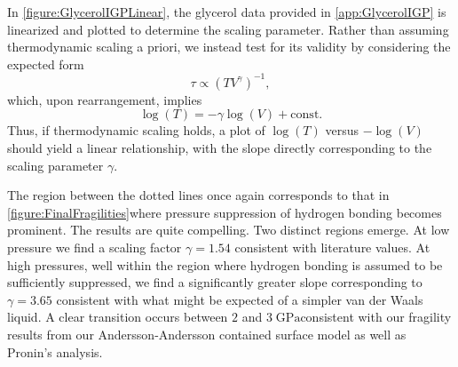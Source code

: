 In \fig \ref{figure:GlycerolIGPLinear}, the glycerol \tgp data provided in \app \ref{app:GlycerolIGP} is linearized and plotted to determine the scaling parameter.  Rather than assuming thermodynamic scaling a priori, we instead test for its validity by considering the expected form
\begin{equation}
	\tau \propto (T V^\gamma)^{-1},
	\label{eqn:GlycerolScaling}
\end{equation}
which, upon rearrangement, implies
\begin{equation}
	\log(T) = -\gamma \log(V) + \mathrm{const}.
	\label{eqn:GlycerolScalingLinear}
\end{equation}
Thus, if thermodynamic scaling holds, a plot of $\log(T)$ versus $-\log(V)$ should yield a linear relationship, with the slope directly corresponding to the scaling parameter $\gamma$.

The region between the dotted lines once again corresponds to that in \fig \ref{figure:FinalFragilities}\textemdash where pressure suppression of hydrogen bonding becomes prominent.  The results are quite compelling.  Two distinct regions emerge.  At low pressure we find a scaling factor $\gamma=1.54$ consistent with literature values. At high pressures, well within the region where hydrogen bonding is assumed to be sufficiently suppressed, we find a significantly greater slope corresponding to $\gamma=3.65$ consistent with what might be expected of a simpler van der Waals liquid. A clear transition occurs between $2$ and $3\;\si{\giga\pascal}$\textemdash consistent with our fragility results from our Andersson-Andersson contained surface model as well as Pronin's analysis.

